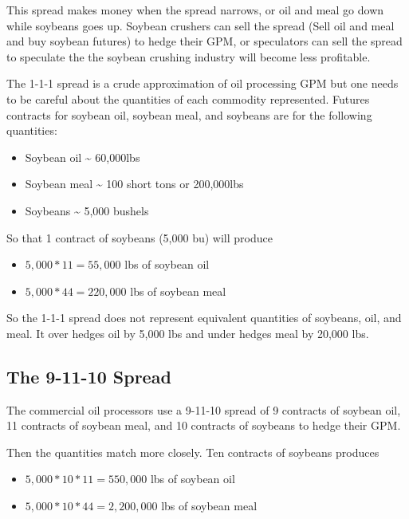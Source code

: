 \documentclass[
  letterpaper,
  DIV=11,
  numbers=noendperiod]{scrreprt}
\providecommand{\tightlist}{%
  \setlength{\itemsep}{0pt}\setlength{\parskip}{0pt}}\usepackage{longtable,booktabs,array}
\begin{document}
This spread makes money when the spread narrows, or oil and meal go down
while soybeans goes up. Soybean crushers can sell the spread (Sell oil
and meal and buy soybean futures) to hedge their GPM, or speculators can
sell the spread to speculate the the soybean crushing industry will
become less profitable.

The 1-1-1 spread is a crude approximation of oil processing GPM but one
needs to be careful about the quantities of each commodity represented.
Futures contracts for soybean oil, soybean meal, and soybeans are for
the following quantities:

\begin{itemize}
\tightlist
\item
  Soybean oil \textasciitilde{} 60,000lbs
\item
  Soybean meal \textasciitilde{} 100 short tons or 200,000lbs
\item
  Soybeans \textasciitilde{} 5,000 bushels
\end{itemize}

So that 1 contract of soybeans (5,000 bu) will produce

\begin{itemize}
\tightlist
\item
  \(5,000*11 = 55,000\) lbs of soybean oil
\item
  \(5,000*44 = 220,000\) lbs of soybean meal
\end{itemize}

So the 1-1-1 spread does not represent equivalent quantities of
soybeans, oil, and meal. It over hedges oil by 5,000 lbs and under
hedges meal by 20,000 lbs.

\hypertarget{the-9-11-10-spread}{%
\subsection{The 9-11-10 Spread}\label{the-9-11-10-spread}}

The commercial oil processors use a 9-11-10 spread of 9 contracts of
soybean oil, 11 contracts of soybean meal, and 10 contracts of soybeans
to hedge their GPM.

Then the quantities match more closely. Ten contracts of soybeans
produces

\begin{itemize}
\tightlist
\item
  \(5,000*10*11 = 550,000\) lbs of soybean oil
\item
  \(5,000*10*44 = 2,200,000\) lbs of soybean meal
\end{itemize}
\end{document}
